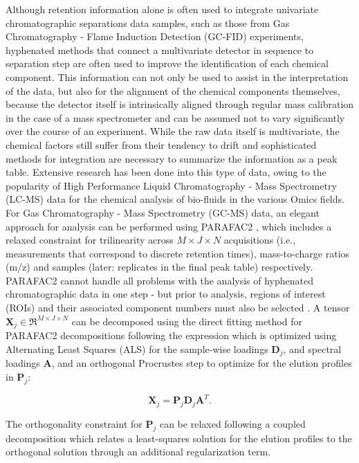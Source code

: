 \documentclass[preprint,12pt]{elsarticle}
\begin{document}
Although retention information alone is often used to integrate univariate chromatographic separations data samples, such as those from Gas Chromatography - Flame Induction Detection (GC-FID) experiments, hyphenated methods that connect a multivariate detector in sequence to separation step are often used to improve the identification of each chemical component. This information can not only be used to assist in the interpretation of the data, but also for the alignment of the chemical components themselves, because the detector itself is intrinsically aligned through regular mass calibration in the case of a mass spectrometer and can be assumed not to vary significantly over the course of an experiment. While the raw data itself is multivariate, the chemical factors still suffer from their tendency to drift and sophisticated methods for integration are necessary to summarize the information as a peak table. Extensive research has been done into this type of data, owing to the popularity of High Performance Liquid Chromatography - Mass Spectrometry (LC-MS) data for the chemical analysis of bio-fluids in the various Omics fields. For Gas Chromatography - Mass Spectrometry (GC-MS) data, an elegant approach for analysis can be performed using PARAFAC2 \cite{kiers1999parafac2}, which includes a relaxed constraint for trilinearity across $M \times J \times N$ acquisitions (i.e., measurements that correspond to discrete retention times), mass-to-charge ratios (m/z) and samples (later: replicates in the final peak table) respectively. PARAFAC2 cannot handle all problems with the analysis of hyphenated chromatographic data in one step - but prior to analysis, regions of interest (ROIs) and their associated component numbers must also be selected \cite{baccolo2021untargeted,giebelhaus2022untargeted}. A tensor $\mathbf{X}_j \in \Re^{M \times J \times N}$ can be decomposed using the direct fitting method for PARAFAC2 decompositions following the expression which is optimized using Alternating Least Squares (ALS) for the sample-wise loadings $\mathbf{D}_j$, and spectral loadings $\mathbf{A}$, and an orthogonal Procrustes step to optimize for the elution profiles in $\mathbf{P}_j$:

\begin{equation}\label{eq:pf2}
    \mathbf{X}_j = \mathbf{P}_j\mathbf{D}_j\mathbf{A}^T.
\end{equation}

The orthogonality constraint for $\mathbf{P}_j$ can be relaxed following a coupled decomposition which relates a least-squares solution for the elution profiles to the orthogonal solution through an additional regularization term\cite{cohen2018nonnegative}.
\end{document}
